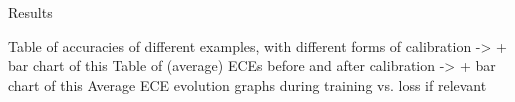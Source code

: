 Results

Table of accuracies of different examples, with different forms of calibration
  -> + bar chart of this
Table of (average) ECEs before and after calibration
  -> + bar chart of this
Average ECE evolution graphs during training vs. loss if relevant